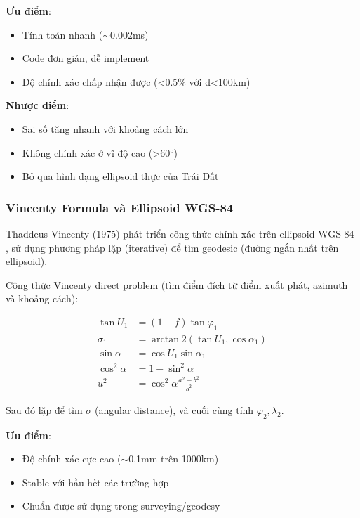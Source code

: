 \textbf{Ưu điểm}:
\begin{itemize}
    \item Tính toán nhanh ($\sim$0.002ms)
    \item Code đơn giản, dễ implement
    \item Độ chính xác chấp nhận được (<0.5\% với d<100km)
\end{itemize}

\textbf{Nhược điểm}:
\begin{itemize}
    \item Sai số tăng nhanh với khoảng cách lớn
    \item Không chính xác ở vĩ độ cao (>60°)
    \item Bỏ qua hình dạng ellipsoid thực của Trái Đất
\end{itemize}

\subsubsection{Vincenty Formula và Ellipsoid WGS-84}
Thaddeus Vincenty (1975) phát triển công thức chính xác trên ellipsoid WGS-84 \cite{vincenty1975direct}, sử dụng phương pháp lặp (iterative) để tìm geodesic (đường ngắn nhất trên ellipsoid).

Công thức Vincenty direct problem (tìm điểm đích từ điểm xuất phát, azimuth và khoảng cách):

\begin{equation}
\begin{aligned}
\tan U_1 &= (1-f) \tan\varphi_1 \\
\sigma_1 &= \arctan2(\tan U_1, \cos\alpha_1) \\
\sin\alpha &= \cos U_1 \sin\alpha_1 \\
\cos^2\alpha &= 1 - \sin^2\alpha \\
u^2 &= \cos^2\alpha \frac{a^2 - b^2}{b^2}
\end{aligned}
\end{equation}

Sau đó lặp để tìm $\sigma$ (angular distance), và cuối cùng tính $\varphi_2, \lambda_2$.

\textbf{Ưu điểm}:
\begin{itemize}
    \item Độ chính xác cực cao ($\sim$0.1mm trên 1000km)
    \item Stable với hầu hết các trường hợp
    \item Chuẩn được sử dụng trong surveying/geodesy
\end{itemize}

